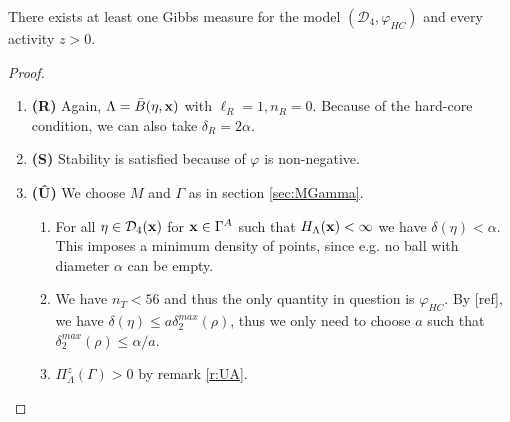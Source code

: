 \begin{proposition}\label{prop:E2}
	There exists at least one Gibbs measure for the model $(\mathcal D_4,\varphi_{HC})$ and every activity $z>0.$
\end{proposition}
\begin{proof}
\begin{enumerate}[]
	\item \textbf{(R)} Again, $\Lambda = \bar B(\eta,{\mathbf{x}})$ with $\ell_R = 1, n_R = 0$. Because of the hard-core condition, we can also take $\delta_R = 2\alpha$.
	\item \textbf{(S)} Stability is satisfied because of $\varphi$ is non-negative.
	\item \textbf{(\^U)} We choose $M$ and $\Gamma$ as in section \ref{sec:MGamma}.
		\begin{enumerate}[(\^U1)]
			\item For all $\eta \in \mathcal D_4({\mathbf{x}})$ for ${\mathbf{x}}\in\Gamma^A$ such that $H_\Lambda({\mathbf{x}})<\infty$ we have $\delta(\eta) < \alpha$. This imposes a minimum density of points, since e.g. no ball with diameter $\alpha$ can be empty. 
			\item We have $n_T<56$ and thus the only quantity in question is $\varphi_{HC}$. By [ref], we have $\delta(\eta)\leq a\delta^{max}_2(\rho)$, thus we only need to choose $a$ such that $\delta^{max}_2(\rho) \leq \alpha / a$.
			\item $\Pi^z_\Lambda(\Gamma)>0$ by remark \ref{r:UA}.
		\end{enumerate}
\end{enumerate}
\end{proof}



